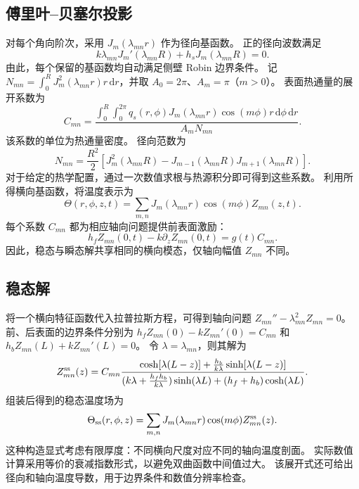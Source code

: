 \documentclass{optica-article}
\newcommand{\dd}{\,\mathrm{d}}
\begin{document}
\subsection{傅里叶--贝塞尔投影}
对每个角向阶次，采用 $J_m(\lambda_{mn}r)$ 作为径向基函数。
正的径向波数满足
\begin{equation}
 k\lambda_{mn}J_m'(\lambda_{mn}R)+h_sJ_m(\lambda_{mn}R)=0.
 \label{eq:radial}
\end{equation}
由此，每个保留的基函数均自动满足侧壁 Robin 边界条件。
记 $N_{mn}=\int_0^R J_m^2(\lambda_{mn}r)r\dd r$，并取 $A_0=2\pi$、$A_m=\pi$（$m>0$）。
表面热通量的展开系数为
\begin{equation}
 C_{mn}=\frac{\displaystyle\int_0^R\!\int_0^{2\pi}
 q_s(r,\phi)J_m(\lambda_{mn}r)\cos(m\phi)r\dd\phi\dd r}{A_mN_{mn}}.
 \label{eq:projection}
\end{equation}
该系数的单位为热通量密度。
径向范数为
\begin{equation}
 N_{mn}=\frac{R^2}{2}\left[J_m^2(\lambda_{mn}R)
       -J_{m-1}(\lambda_{mn}R)J_{m+1}(\lambda_{mn}R)\right].
\end{equation}
对于给定的热学配置，通过一次数值求根与热源积分即可得到这些系数。
利用所得横向基函数，将温度表示为
\[
 \Theta(r,\phi,z,t)=\sum_{m,n}J_m(\lambda_{mn}r)\cos(m\phi)Z_{mn}(z,t).
\]
每个系数 $C_{mn}$ 都为相应轴向问题提供前表面激励：
\[
 h_fZ_{mn}(0,t)-k\partial_zZ_{mn}(0,t)=g(t)C_{mn}.
\]
因此，稳态与瞬态解共享相同的横向模态，仅轴向幅值 $Z_{mn}$ 不同。

\subsection{稳态解}
将一个横向特征函数代入拉普拉斯方程，可得到轴向问题 $Z_{mn}''-\lambda_{mn}^2Z_{mn}=0$。
前、后表面的边界条件分别为 $h_fZ_{mn}(0)-kZ_{mn}'(0)=C_{mn}$ 和 $h_bZ_{mn}(L)+kZ_{mn}'(L)=0$。
令 $\lambda=\lambda_{mn}$，则其解为
\begin{equation}
 Z_{mn}^{\rm ss}(z)=C_{mn}\frac{\cosh[\lambda(L-z)]+\frac{h_b}{k\lambda}\sinh[\lambda(L-z)]}
 {(k\lambda+\frac{h_fh_b}{k\lambda})\sinh(\lambda L)+(h_f+h_b)\cosh(\lambda L)}.
 \label{eq:steadyaxial}
\end{equation}
组装后得到的稳态温度场为
\begin{equation}
 \Theta_{\rm ss}(r,\phi,z)=\sum_{m,n}J_m(\lambda_{mn}r)\cos(m\phi)Z_{mn}^{\rm ss}(z).
 \label{eq:steady}
\end{equation}
这种构造显式考虑有限厚度：不同横向尺度对应不同的轴向温度剖面。
实际数值计算采用等价的衰减指数形式，以避免双曲函数中间值过大。
该展开式还可给出径向和轴向温度导数，用于边界条件和数值分辨率检查。
\end{document}
